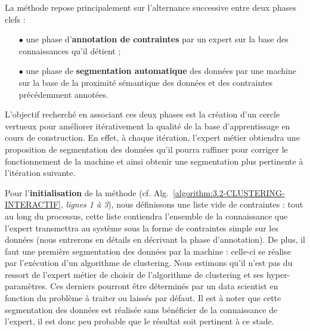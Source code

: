 		
		La méthode repose principalement sur l'alternance successive entre deux phases clefs :
		\begin{itemize}
			\item[\(\bullet\)] une phase d'\textbf{annotation de contraintes}
			par un expert sur la base des connaissances qu'il détient ;
			\item[\(\bullet\)] une phase de \textbf{segmentation automatique} des données
			par une machine sur la base de la proximité sémantique des données et des contraintes précédemment annotées.
		\end{itemize}
		
		L'objectif recherché en associant ces deux phases est la création d'un cercle vertueux pour améliorer itérativement la qualité de la base d'apprentissage en cours de construction.
		En effet, à chaque itération, l'expert métier obtiendra une proposition de segmentation des données qu'il pourra raffiner pour corriger le fonctionnement de la machine et ainsi obtenir une segmentation plus pertinente à l'itération suivante.
		
		Pour l'\textbf{initialisation} de la méthode (cf. Alg.~\ref{algorithm:3.2-CLUSTERING-INTERACTIF}, \textit{lignes 1 à 3}), nous définissons une liste vide de contraintes : tout au long du processus, cette liste contiendra l'ensemble de la connaissance que l'expert transmettra au système sous la forme de contraintes simple sur les données (nous entrerons en détails en décrivant la phase d'annotation).
		De plus, il faut une première segmentation des données par la machine : celle-ci se réalise par l'exécution d'un algorithme de clustering. Nous estimons qu'il n'est pas du ressort de l'expert métier de choisir de l'algorithme de clustering et ses hyper-paramètres. Ces derniers pourront être déterminés par un data scientist en fonction du problème à traiter ou laissés par défaut.
		Il est à noter que cette segmentation des données est réalisée sans bénéficier de la connaissance de l'expert, il est donc peu probable que le résultat soit pertinent à ce stade.
		
